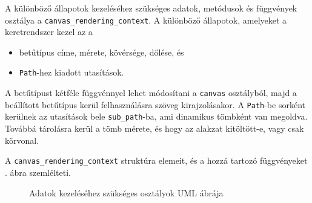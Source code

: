 
A különböző állapotok kezeléséhez szükséges adatok, metódusok és függvények osztálya a \texttt{canvas\_rendering\_context}.
A különböző állapotok, amelyeket a keretrendszer kezel az a
\begin{itemize}
    \item betűtípus címe, mérete, kövérsége, dőlése, és
    \item \texttt{Path}-hez kiadott utasítások.
\end{itemize}
A betűtípust kétféle függvénnyel lehet módosítani a \texttt{canvas} osztályból, majd a beállított betűtípus kerül felhasználásra szöveg kirajzolásakor.
A \texttt{Path}-be sorként kerülnek az utasítások bele \texttt{sub\_path}-ba, ami dinamikus tömbként van megoldva.
Továbbá tárolásra kerül a tömb mérete, és hogy az alakzat kitöltött-e, vagy csak körvonal.

A \texttt{canvas\_rendering\_context} struktúra elemeit, és a hozzá tartozó függvényeket . ábra szemlélteti.


\begin{figure}[h!]
    \centering
    \caption{Adatok kezeléséhez szükséges osztályok UML ábrája}
    \label{fig:data-uml}
\end{figure}


